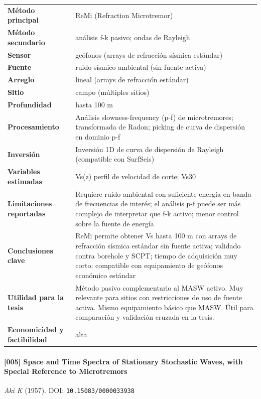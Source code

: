 \begin{center}\scriptsize
\begin{tabularx}{\textwidth}{@{}>{\bfseries}p{3.3cm} X@{}}
\toprule
M\'etodo principal & ReMi (Refraction Microtremor) \\
M\'etodo secundario & análisis f-k pasivo; ondas de Rayleigh \\
Sensor & geófonos (arrays de refracción sísmica estándar) \\
Fuente & ruido sísmico ambiental (sin fuente activa) \\
Arreglo & lineal (arrays de refracción estándar) \\
Sitio & campo (múltiples sitios) \\
Profundidad & hasta 100 m \\
Procesamiento & Análisis slowness-frequency (p-f) de microtremores; transformada de Radon; picking de curva de dispersión en dominio p-f \\
Inversi\'on & Inversión 1D de curva de dispersión de Rayleigh (compatible con SurfSeis) \\
Variables estimadas & Vs(z) perfil de velocidad de corte; Vs30 \\
Limitaciones reportadas & Requiere ruido ambiental con suficiente energía en banda de frecuencias de interés; el análisis p-f puede ser más complejo de interpretar que f-k activo; menor control sobre la fuente de energía \\
Conclusiones clave & ReMi permite obtener Vs hasta 100 m con arrays de refracción sísmica estándar sin fuente activa; validado contra borehole y SCPT; tiempo de adquisición muy corto; compatible con equipamiento de geófonos económico estándar \\
Utilidad para la tesis & Método pasivo complementario al MASW activo. Muy relevante para sitios con restricciones de uso de fuente activa. Mismo equipamiento básico que MASW. Útil para comparación y validación cruzada en la tesis. \\
Economicidad y factibilidad & alta \\
\bottomrule
\end{tabularx}
\end{center}

\paragraph{[005] Space and Time Spectra of Stationary Stochastic Waves, with Special Reference to Microtremors} \emph{Aki K} (1957).
{\scriptsize DOI: \texttt{10.15083/0000033938}}

